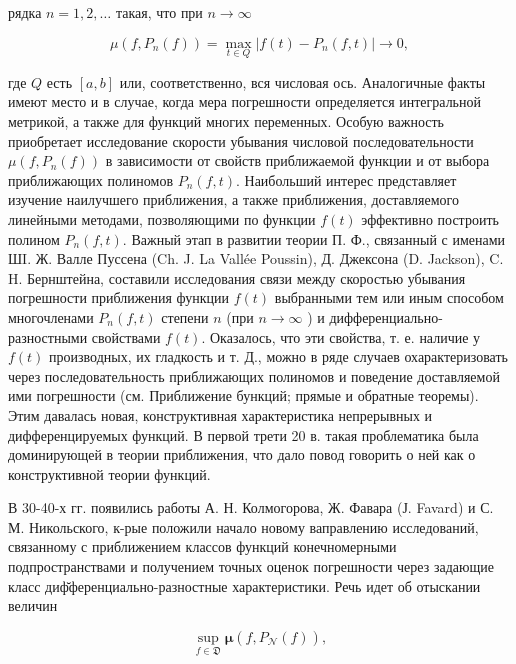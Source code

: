 \documentclass[10pt]{article}
\begin{document}
рядка $n=1,2, \ldots$ такая, что при $n \rightarrow \infty$



\[

\mu\left(f, P_{n}(f)\right)=\max _{t \in Q}\left|f(t)-P_{n}(f, t)\right| \longrightarrow 0,

\]



где $Q$ есть $[a, b]$ или, соответственно, вся числовая ось. Аналогичные факты имеют место и в случае, когда мера погрешности определяется интегральной метрикой, а также для функций многих переменных. Особую важность приобретает исследование скорости убывания числовой последовательности $\mu\left(f, P_{n}(f)\right)$ в зависимости от свойств приближаемой функции и от выбора приближающих полиномов $P_{n}(f, t)$. Наибольший интерес представляет изучение наилучшего приближения, а также приближения, доставляемого линейными методами, позволяющими по функции $f(t)$ эффективно построить полином $P_{n}(f, t)$. Важный этап в развитии теории П. Ф., связанный с именами ШI. Ж. Валле Пуссена (Ch. J. La Vallée Poussin), Д. Джексона (D. Jackson), C. H. Бернштейна, составили исследования связи между скоростью убывания погрешности приближения функции $f(t)$ выбранными тем или иным способом многочленами $P_{n}(f, t)$ степени $n$ (при $n \rightarrow \infty$ ) и дифференциально-разностными свойствами $f(t)$. Оказалось, что эти свойства, т. е. наличие у $f(t)$ производных, их гладкость и т. Д., можно в ряде случаев охарактеризовать через последовательность приближающих полиномов и поведение доставляемой ими погрешности (см. Приближение бункций; прямые и обратные теоремы). Этим давалась новая, конструктивная характеристика непрерывных и дифференцируемых функций. В первой трети 20 в. такая проблематика была доминирующей в теории приближения, что дало повод говорить о ней как о конструктивной теории функций.



В 30-40-х гг. появились работы А. Н. Колмогорова, Ж. Фавара (Ј. Favard) и С. М. Никольского, к-рые положили начало новому ваправлению исследований, связанному с приближением классов функций конечномерными подпространствами и получением точных оценок погрешности через задающие класс диф̆ференциально-разностные характеристики. Речь идет об отыскании величин



\[

\sup _{f \in \mathfrak{D}} \boldsymbol{\mu}\left(f, P_{\mathcal{N}}(f)\right),

\]
\end{document}

